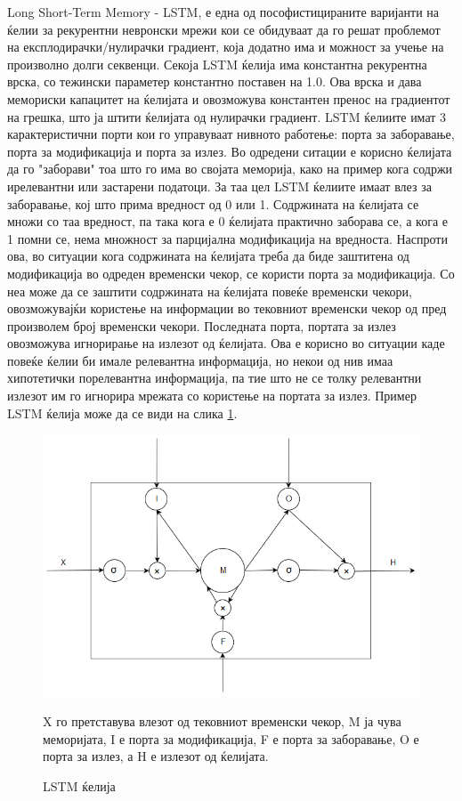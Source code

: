 Long Short-Term Memory - LSTM, е една од пософистицираните варијанти на ќелии за рекурентни невронски мрежи кои се обидуваат да го решат проблемот на експлодирачки/нулирачки градиент, која додатно има и можност за учење на произволно долги секвенци. Секоја LSTM ќелија има константна рекурентна врска, со тежински параметер константно поставен на 1.0. Ова врска и дава мемориски капацитет на ќелијата и овозможува константен пренос на градиентот на грешка, што ја штити ќелијата од нулирачки градиент. 
LSTM ќелиите имат 3 карактеристични порти кои го управуваат нивното работење: порта за заборавање, порта за модификација и порта за излез. Во одредени ситации е корисно ќелијата да го "заборави" тоа што го има во својата меморија, како на пример кога содржи ирелевантни или застарени податоци. За таа цел LSTM ќелиите имаат влез за заборавање, кој што прима вредност од 0 или 1. Содржината на ќелијата се множи со таа вредност, па така кога е 0 ќелијата практично заборава се, а кога е 1 помни се, нема множност за парцијална модификација на вредноста. Наспроти ова, во ситуации кога содржината на ќелијата треба да биде заштитена од модификација во одреден временски чекор, се користи порта за модификација. Со неа може да се заштити содржината на ќелијата повеќе временски чекори, овозможувајќи користење на информации во тековниот временски чекор од пред произволем број временски чекори. Последната порта, портата за излез овозможува игнорирање на излезот од ќелијата. Ова е корисно во ситуации каде повеќе ќелии би имале релевантна информација, но некои од нив имаа хипотетички порелевантна информација, па тие што не се толку релевантни излезот им го игнорира мрежата со користење на портата за излез. Пример LSTM ќелија може да се види на слика \ref{fig:lstm}.

\begin{figure}[H]
	\centering
    \includegraphics[scale=0.6]{images/lstm.png}
	\caption{LSTM ќелија}
	X го претставува влезот од тековниот временски чекор, M ја чува меморијата, I е порта за модификација, F е порта за заборавање, O е порта за излез, а H е излезот од ќелијата.
	\label{fig:lstm}
\end{figure}

